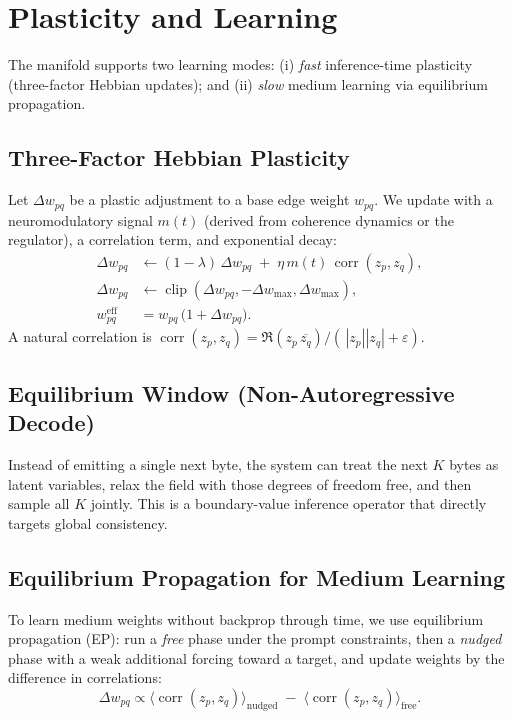 \documentclass[11pt,a4paper]{article}
\newcommand{\eps}{\varepsilon}
\newcommand{\z}{z}                %
\begin{document}
\section{Plasticity and Learning}
\label{sec:learning}

The manifold supports two learning modes:
(i) \emph{fast} inference-time plasticity (three-factor Hebbian updates); and
(ii) \emph{slow} medium learning via equilibrium propagation.

\subsection{Three-Factor Hebbian Plasticity}
Let $\Delta w_{pq}$ be a plastic adjustment to a base edge weight $w_{pq}$. We update with a neuromodulatory signal $m(t)$ (derived from coherence dynamics or the regulator), a correlation term, and exponential decay:
\begin{align}
\Delta w_{pq} &\leftarrow (1-\lambda)\,\Delta w_{pq} \;+\; \eta\,m(t)\,\operatorname{corr}(\z_p,\z_q),\\
\Delta w_{pq} &\leftarrow \operatorname{clip}(\Delta w_{pq},-\Delta w_{\max},\Delta w_{\max}),\\
w^{\text{eff}}_{pq} &= w_{pq}\,\bigl(1+\Delta w_{pq}\bigr).
\end{align}
A natural correlation is $\operatorname{corr}(\z_p,\z_q)=\Re(\z_p\,\overline{\z_q})/(\,|\z_p||\z_q|+\eps)$.

\subsection{Equilibrium Window (Non-Autoregressive Decode)}
\label{sec:eq_window}
Instead of emitting a single next byte, the system can treat the next $K$ bytes as latent variables, relax the field with those degrees of freedom free, and then sample all $K$ jointly. This is a boundary-value inference operator that directly targets global consistency.

\subsection{Equilibrium Propagation for Medium Learning}
\label{sec:ep}
To learn medium weights without backprop through time, we use equilibrium propagation (EP): run a \emph{free} phase under the prompt constraints, then a \emph{nudged} phase with a weak additional forcing toward a target, and update weights by the difference in correlations:
\begin{equation}
\Delta w_{pq} \propto \bigl\langle \operatorname{corr}(\z_p,\z_q)\bigr\rangle_{\text{nudged}} \;-\;
\bigl\langle \operatorname{corr}(\z_p,\z_q)\bigr\rangle_{\text{free}}.
\end{equation}
\end{document}
